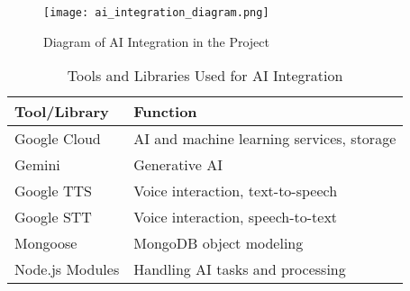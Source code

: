 \begin{figure}[h]
    \centering
    \texttt{[image: ai\_integration\_diagram.png]}
    \caption{Diagram of AI Integration in the Project}
    \label{fig:ai_integration}
\end{figure}

\begin{table}[h]
    \centering
    \begin{tabular}{|l|l|}
        \hline
        \textbf{Tool/Library} & \textbf{Function} \\
        \hline
        Google Cloud & AI and machine learning services, storage \\
        Gemini & Generative AI \\
        Google TTS & Voice interaction, text-to-speech \\
        Google STT & Voice interaction, speech-to-text \\
        Mongoose & MongoDB object modeling \\
        Node.js Modules & Handling AI tasks and processing \\
        \hline
    \end{tabular}
    \caption{Tools and Libraries Used for AI Integration}
    \label{tab:ai_tools}
\end{table}